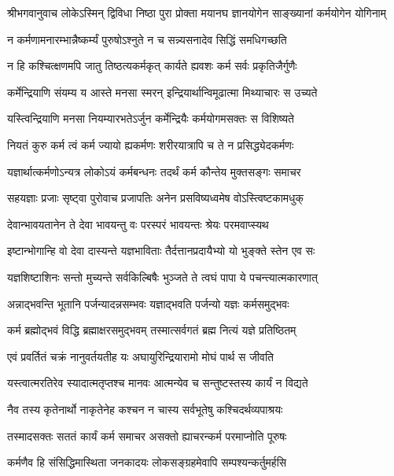 {श्रीभगवानुवाच}
\twolineshloka
{लोकेऽस्मिन् द्विविधा निष्ठा पुरा प्रोक्ता मयानघ}
{ज्ञानयोगेन साङ्ख्यानां कर्मयोगेन योगिनाम्}%

\twolineshloka
{न कर्मणामनारम्भान्नैष्कर्म्यं पुरुषोऽश्नुते}
{न च सन्न्यसनादेव सिद्धिं समधिगच्छति}%

\twolineshloka
{न हि कश्चित्क्षणमपि जातु तिष्ठत्यकर्मकृत्}
{कार्यते ह्यवशः कर्म सर्वः प्रकृतिजैर्गुणैः}%

\twolineshloka
{कर्मेन्द्रियाणि संयम्य य आस्ते मनसा स्मरन्}
{इन्द्रियार्थान्विमूढात्मा मिथ्याचारः स उच्यते}%

\twolineshloka
{यस्त्विन्द्रियाणि मनसा नियम्यारभतेऽर्जुन}
{कर्मेन्द्रियैः कर्मयोगमसक्तः स विशिष्यते}%

\twolineshloka
{नियतं कुरु कर्म त्वं कर्म ज्यायो ह्यकर्मणः}
{शरीरयात्रापि च ते न प्रसिद्ध्येदकर्मणः}%

\twolineshloka
{यज्ञार्थात्कर्मणोऽन्यत्र लोकोऽयं कर्मबन्धनः}
{तदर्थं कर्म कौन्तेय मुक्तसङ्गः समाचर}%

\twolineshloka
{सहयज्ञाः प्रजाः सृष्ट्वा पुरोवाच प्रजापतिः}
{अनेन प्रसविष्यध्वमेष वोऽस्त्विष्टकामधुक्}%

\twolineshloka
{देवान्भावयतानेन ते देवा भावयन्तु वः}
{परस्परं भावयन्तः श्रेयः परमवाप्स्यथ}%

\twolineshloka
{इष्टान्भोगान्हि वो देवा दास्यन्ते यज्ञभाविताः}
{तैर्दत्तानप्रदायैभ्यो यो भुङ्क्ते स्तेन एव सः}%

\twolineshloka
{यज्ञशिष्टाशिनः सन्तो मुच्यन्ते सर्वकिल्बिषैः}
{भुञ्जते ते त्वघं पापा ये पचन्त्यात्मकारणात्}%

\twolineshloka
{अन्नाद्भवन्ति भूतानि पर्जन्यादन्नसम्भवः}
{यज्ञाद्भवति पर्जन्यो यज्ञः कर्मसमुद्भवः}%

\twolineshloka
{कर्म ब्रह्मोद्भवं विद्धि ब्रह्माक्षरसमुद्भवम्}
{तस्मात्सर्वगतं ब्रह्म नित्यं यज्ञे प्रतिष्ठितम्}%

\twolineshloka
{एवं प्रवर्तितं चक्रं नानुवर्तयतीह यः}
{अघायुरिन्द्रियारामो मोघं पार्थ स जीवति}%

\twolineshloka
{यस्त्वात्मरतिरेव स्यादात्मतृप्तश्च मानवः}
{आत्मन्येव च सन्तुष्टस्तस्य कार्यं न विद्यते}%

\twolineshloka
{नैव तस्य कृतेनार्थो नाकृतेनेह कश्चन}
{न चास्य सर्वभूतेषु कश्चिदर्थव्यपाश्रयः}%

\twolineshloka
{तस्मादसक्तः सततं कार्यं कर्म समाचर}
{असक्तो ह्याचरन्कर्म परमाप्नोति पूरुषः}%

\twolineshloka
{कर्मणैव हि संसिद्धिमास्थिता जनकादयः}
{लोकसङ्ग्रहमेवापि सम्पश्यन्कर्तुमर्हसि}%

